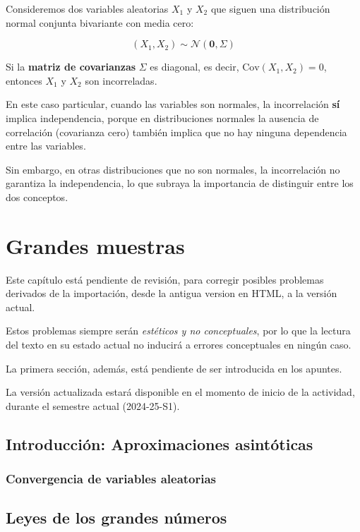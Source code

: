 \documentclass[
]{article}
\begin{document}
Consideremos dos variables aleatorias \(X_1\) y \(X_2\) que siguen una distribución normal conjunta bivariante con media cero:

\[
(X_1, X_2) \sim \mathcal{N}\left(\mathbf{0}, \Sigma \right)
\]

Si la \textbf{matriz de covarianzas} \(\Sigma\) es diagonal, es decir, \(\text{Cov}(X_1, X_2) = 0\), entonces \(X_1\) y \(X_2\) son incorreladas.

En este caso particular, cuando las variables son normales, la incorrelación \textbf{sí} implica independencia, porque en distribuciones normales la ausencia de correlación (covarianza cero) también implica que no hay ninguna dependencia entre las variables.

Sin embargo, en otras distribuciones que no son normales, la incorrelación no garantiza la independencia, lo que subraya la importancia de distinguir entre los dos conceptos.

\section{Grandes muestras}\label{grandes-muestras}

Este capítulo está pendiente de revisión, para corregir posibles problemas derivados de la importación, desde la antigua version en HTML, a la versión actual.

Estos problemas siempre serán \emph{estéticos y no conceptuales}, por lo que la lectura del texto en su estado actual no inducirá a errores conceptuales en ningún caso.

La primera sección, además, está pendiente de ser introducida en los apuntes.

La versión actualizada estará disponible en el momento de inicio de la actividad, durante el semestre actual (2024-25-S1).

\subsection{Introducción: Aproximaciones asintóticas}\label{introducciuxf3n-aproximaciones-asintuxf3ticas}

\subsubsection{Convergencia de variables aleatorias}\label{convergencia-de-variables-aleatorias}

\subsection{Leyes de los grandes números}\label{leyes-de-los-grandes-nuxfameros}
\end{document}
